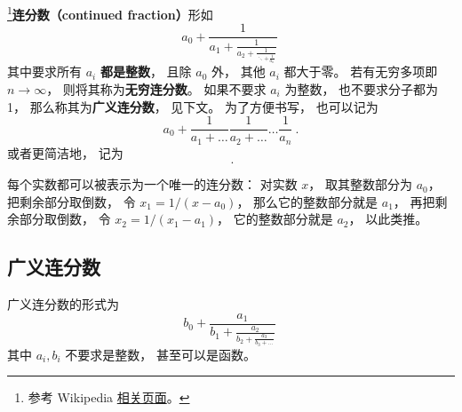 
\footnote{参考 Wikipedia \href{https://en.wikipedia.org/wiki/Continued_fraction}{相关页面}。}\textbf{连分数（continued fraction）}形如
\begin{equation}
a_0 + \frac{1}{\displaystyle a_1 + \frac{1}{\displaystyle a_2 + \frac{1}{\displaystyle \ddots + \frac{1}{a_n}}}}~
\end{equation}
其中要求所有 $a_i$ \textbf{都是整数}， 且除 $a_0$ 外， 其他 $a_i$ 都大于零。 若有无穷多项即 $n\to\infty$， 则将其称为\textbf{无穷连分数}。 如果不要求 $a_i$ 为整数， 也不要求分子都为 1， 那么称其为\textbf{广义连分数}， 见下文。 为了方便书写， 也可以记为
\begin{equation}
a_0 + \frac{1}{a_1 + \dots}\frac{1}{a_2 + \dots}\dots \frac{1}{a_n}~.
\end{equation}
或者更简洁地， 记为
\begin{equation}
[a_0;\ a_1,\ a_2,\ \dots\ ,\ a_n]~.
\end{equation}

每个实数都可以被表示为一个唯一的连分数： 对实数 $x$， 取其整数部分为 $a_0$， 把剩余部分取倒数， 令 $x_1 = 1/(x-a_0)$， 那么它的整数部分就是 $a_1$， 再把剩余部分取倒数， 令 $x_2 = 1/(x_1 - a_1)$， 它的整数部分就是 $a_2$， 以此类推。

\subsection{广义连分数}
广义连分数的形式为
\begin{equation}
b_0 + \frac{a_1}{\displaystyle b_1 + \frac{a_2}{\displaystyle b_2 + \frac{a_3}{\displaystyle b_3 + \dots}}}~
\end{equation}
其中 $a_i, b_i$ 不要求是整数， 甚至可以是函数。
